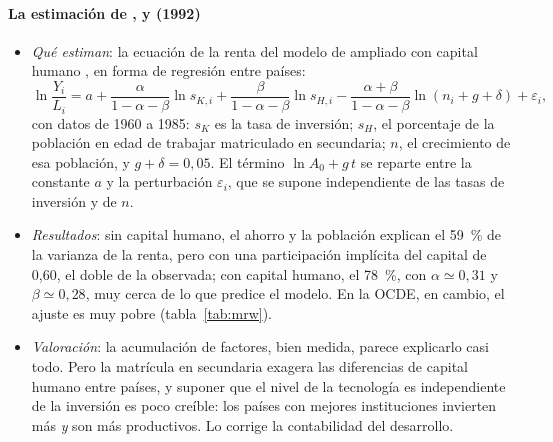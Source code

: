 \documentclass[11pt]{article}
\begin{document}
\paragraph{La estimación de ,  y  (1992)}

\begin{itemize}
\item \emph{Qué estiman}: la ecuación de la renta del modelo de  ampliado con capital humano , en forma de regresión entre países:
  \begin{equation}
  \ln\frac{Y_i}{L_i}=a+\frac{\alpha}{1-\alpha-\beta}\ln s_{K,i}+\frac{\beta}{1-\alpha-\beta}\ln s_{H,i}-\frac{\alpha+\beta}{1-\alpha-\beta}\ln(n_i+g+\delta)+\varepsilon_i ,\label{eq:mrw-regresion}
  \end{equation}
  con datos de 1960 a 1985: $s_K$ es la tasa de inversión; $s_H$, el porcentaje de la población en edad de trabajar matriculado en secundaria; $n$, el crecimiento de esa población, y $g+\delta=0{,}05$. El término $\ln A_0+g\,t$ se reparte entre la constante $a$ y la perturbación $\varepsilon_i$, que se supone independiente de las tasas de inversión y de $n$.
\item \emph{Resultados}: sin capital humano, el ahorro y la población explican el 59~\% de la varianza de la renta, pero con una participación implícita del capital de 0,60, el doble de la observada; con capital humano, el 78~\%, con $\alpha\simeq0{,}31$ y $\beta\simeq0{,}28$, muy cerca de lo que predice el modelo\nocite{MankiwRomerWeil1992}. En la OCDE, en cambio, el ajuste es muy pobre (tabla~\ref{tab:mrw}).
\item \emph{Valoración}: la acumulación de factores, bien medida, parece explicarlo casi todo. Pero la matrícula en secundaria exagera las diferencias de capital humano entre países, y suponer que el nivel de la tecnología es independiente de la inversión es poco creíble: los países con mejores instituciones invierten más \emph{y} son más productivos. Lo corrige la contabilidad del desarrollo.
\end{itemize}
\end{document}

